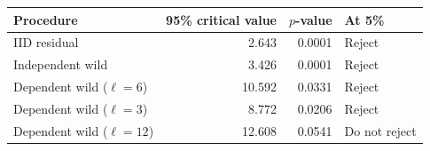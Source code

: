 \begin{tabular}{lrrl}
\toprule
Procedure & 95\% critical value & $p$-value & At 5\% \\
\midrule
IID residual & 2.643 & 0.0001 & Reject \\
Independent wild & 3.426 & 0.0001 & Reject \\
Dependent wild ($\ell=6$) & 10.592 & 0.0331 & Reject \\
Dependent wild ($\ell=3$) & 8.772 & 0.0206 & Reject \\
Dependent wild ($\ell=12$) & 12.608 & 0.0541 & Do not reject \\
\bottomrule
\end{tabular}
